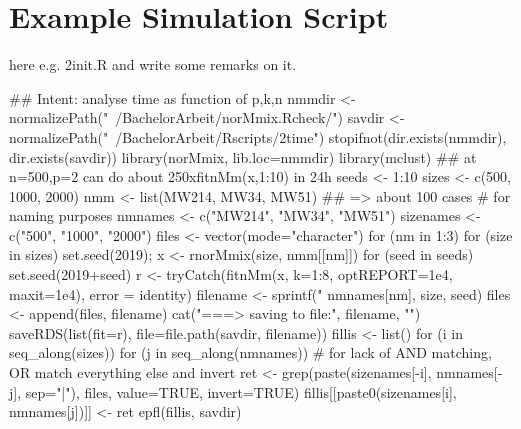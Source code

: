 \begin{Schunk}
\end{Schunk}

\clearpage
\section{Example Simulation Script}

\label{App:sims}
here e.g. 2init.R and write some remarks on it.

\begin{Schunk}
\begin{Soutput}
## Intent: analyse time as function of p,k,n
nmmdir <- normalizePath("~/BachelorArbeit/norMmix.Rcheck/")
savdir <- normalizePath("~/BachelorArbeit/Rscripts/2time")
stopifnot(dir.exists(nmmdir), dir.exists(savdir))
library(norMmix, lib.loc=nmmdir)
library(mclust)
## at n=500,p=2 can do about 250xfitnMm(x,1:10) in 24h
seeds <- 1:10
sizes <- c(500, 1000, 2000)
nmm <- list(MW214, MW34, MW51)
## => about 100 cases
# for naming purposes
nmnames <- c("MW214", "MW34", "MW51")
sizenames <- c("500", "1000", "2000")
files <- vector(mode="character")
for (nm in 1:3) {
    for (size in sizes) {
    set.seed(2019); x <- rnorMmix(size, nmm[[nm]])
        for (seed in seeds) {
            set.seed(2019+seed)
            r <- tryCatch(fitnMm(x, k=1:8,
                                 optREPORT=1e4, maxit=1e4),
                          error = identity)
            filename <- sprintf("%s_size=%0.4d_seed=%0.2d.rds",
                                nmnames[nm], size, seed)
            files <- append(files, filename)
            cat("===> saving to file:", filename, "\n")
            saveRDS(list(fit=r), file=file.path(savdir, filename))
        }
    }
}
fillis <- list()
for (i in seq_along(sizes)) {
    for (j in seq_along(nmnames)) {
        # for lack of AND matching, OR match everything else and invert
        ret <- grep(paste(sizenames[-i], nmnames[-j], sep="|"), 
                    files, value=TRUE, invert=TRUE)
        fillis[[paste0(sizenames[i], nmnames[j])]] <- ret
    }
}
epfl(fillis, savdir)
\end{Soutput}
\end{Schunk}

